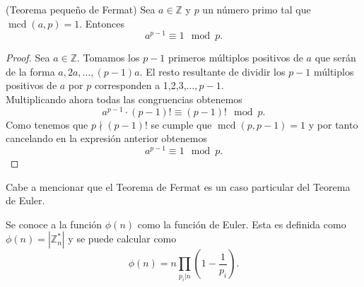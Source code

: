 \begin{teorema}
		(Teorema pequeño de Fermat) Sea $a \in \mathbb{Z}$ y $p$ un número primo tal que $\operatorname{mcd}(a,p)=1$. Entonces
	$$
		a^{p-1} \equiv 1 \mod p.
	$$
\end{teorema}\vspace*{-7mm}
\begin{proof}
		Sea $a \in \mathbb{Z}$. Tomamos los $p-1$ primeros múltiplos positivos de $a$ que serán de la forma $a, 2a,\dots,(p-1)a$. El resto resultante de dividir los $p-1$ múltiplos positivos de $a$ por $p$ corresponden a 1,2,3,$\dots,p-1$.\\
	Multiplicando ahora todas las congruencias obtenemos 
	$$
		a^{p-1}·(p-1)! \equiv (p-1)! \mod p.
	$$
	Como tenemos que $p\nmid (p-1)!$ se cumple que $\operatorname{mcd}(p,p-1)=1$ y por tanto cancelando en la expresión anterior obtenemos
	$$
		a^{p-1} \equiv 1 \mod p. 
	$$
\end{proof}

Cabe a mencionar que el Teorema de Fermat es un caso particular del Teorema de Euler.\\
\begin{definicion}
Se conoce a la función $\phi(n)$ como la función de Euler. Esta es definida como $\phi(n)=|\mathbb{Z}^*_n|$ y se puede calcular como $$\phi(n)=n\prod_{p_i|n}\left(1-\frac{1}{p_i}\right).$$
\end{definicion}

